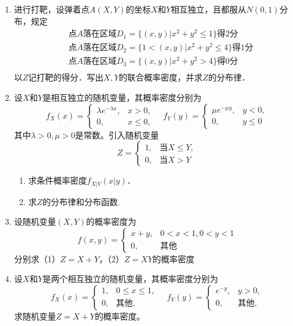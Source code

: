 \documentclass[10pt,a4paper]{article}
\begin{document}
\begin{enumerate}
     \item 进行打靶，设弹着点$A(X,Y)$的坐标$X$和$Y$相互独立，且都服从$N(0,1)$分布，规定
    \begin{equation}
        \begin{aligned}
        \nonumber
        &\text{点}A\mbox{落在区域}D_1=\{(x,y)|x^2+y^2\leq 1\}\mbox{得}2\mbox{分}\\
        &\mbox{点}A\mbox{落在区域}D_2=\{1<(x,y)|x^2+y^2\leq 4\}\mbox{得}1\mbox{分}\\
        &\mbox{点}A\mbox{落在区域}D_3=\{(x,y)|x^2+y^2>4\}\mbox{得}0\mbox{分}\\              
        \end{aligned}
    \end{equation}
    以$Z$记打靶的得分．写出$X,Y$的联合概率密度，并求$Z$的分布律．


    \item 设$X$和$Y$是相互独立的随机变量，其概率密度分别为
    $$f_X(x)=\left\{\begin{array}{ll}
        \lambda e^{-\lambda x}, & x>0,\\
        0, & x\leq 0,
    \end{array}\right.\quad
    f_Y(y)=\left\{\begin{array}{ll}
        \mu e^{-\mu y}, & y<0,\\
        0, & y\leq 0
    \end{array}\right.$$
    其中$\lambda>0,\mu>0$是常数。引入随机变量
    $$Z=\left\{\begin{array}{ll}
        1, & \mbox{当}X\leq Y,\\
        0, & \mbox{当}X>Y
    \end{array}\right.$$
    \begin{enumerate}
        \item 求条件概率密度$f_{X|Y}(x|y)$．
        \item 求$Z$的分布律和分布函数.
    \end{enumerate}
     


    \item 设随机变量$(X,Y)$的概率密度为
    $$f(x,y)=\left\{\begin{array}{ll}
        x+y, & 0<x<1,0<y<1\\
        0, & \mbox{其他}
    \end{array}\right.$$
    分别求（1）$Z=X+Y$，（2）$Z=XY$的概率密度


    \item 设$X$和$Y$是两个相互独立的随机变量，其概率密度分别为
    $$f_X(x)=\left\{\begin{array}{ll}
        1, & 0\leq x\leq 1,\\
        0, & \mbox{其他},
    \end{array}\right.\quad
    f_Y(y)=\left\{\begin{array}{ll}
        e^{-y}, & y>0,\\
        0, & \mbox{其他},
    \end{array}\right.$$
    求随机变量$Z=X+Y$的概率密度。


\end{enumerate}
\end{document}
